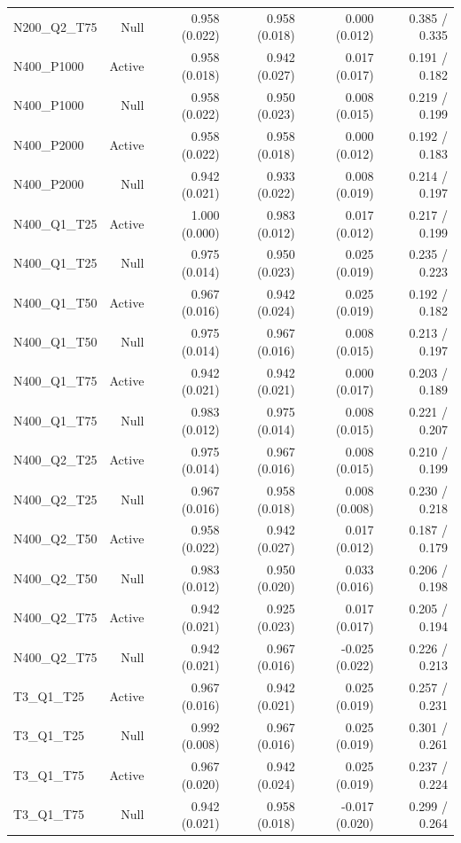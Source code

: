 \begin{longtable}{lrrrrr}
N200\_Q2\_T75 & Null & 0.958 (0.022) & 0.958 (0.018) & 0.000 (0.012) & 0.385 / 0.335 \\
N400\_P1000 & Active & 0.958 (0.018) & 0.942 (0.027) & 0.017 (0.017) & 0.191 / 0.182 \\
N400\_P1000 & Null & 0.958 (0.022) & 0.950 (0.023) & 0.008 (0.015) & 0.219 / 0.199 \\
N400\_P2000 & Active & 0.958 (0.022) & 0.958 (0.018) & 0.000 (0.012) & 0.192 / 0.183 \\
N400\_P2000 & Null & 0.942 (0.021) & 0.933 (0.022) & 0.008 (0.019) & 0.214 / 0.197 \\
N400\_Q1\_T25 & Active & 1.000 (0.000) & 0.983 (0.012) & 0.017 (0.012) & 0.217 / 0.199 \\
N400\_Q1\_T25 & Null & 0.975 (0.014) & 0.950 (0.023) & 0.025 (0.019) & 0.235 / 0.223 \\
N400\_Q1\_T50 & Active & 0.967 (0.016) & 0.942 (0.024) & 0.025 (0.019) & 0.192 / 0.182 \\
N400\_Q1\_T50 & Null & 0.975 (0.014) & 0.967 (0.016) & 0.008 (0.015) & 0.213 / 0.197 \\
N400\_Q1\_T75 & Active & 0.942 (0.021) & 0.942 (0.021) & 0.000 (0.017) & 0.203 / 0.189 \\
N400\_Q1\_T75 & Null & 0.983 (0.012) & 0.975 (0.014) & 0.008 (0.015) & 0.221 / 0.207 \\
N400\_Q2\_T25 & Active & 0.975 (0.014) & 0.967 (0.016) & 0.008 (0.015) & 0.210 / 0.199 \\
N400\_Q2\_T25 & Null & 0.967 (0.016) & 0.958 (0.018) & 0.008 (0.008) & 0.230 / 0.218 \\
N400\_Q2\_T50 & Active & 0.958 (0.022) & 0.942 (0.027) & 0.017 (0.012) & 0.187 / 0.179 \\
N400\_Q2\_T50 & Null & 0.983 (0.012) & 0.950 (0.020) & 0.033 (0.016) & 0.206 / 0.198 \\
N400\_Q2\_T75 & Active & 0.942 (0.021) & 0.925 (0.023) & 0.017 (0.017) & 0.205 / 0.194 \\
N400\_Q2\_T75 & Null & 0.942 (0.021) & 0.967 (0.016) & -0.025 (0.022) & 0.226 / 0.213 \\
T3\_Q1\_T25 & Active & 0.967 (0.016) & 0.942 (0.021) & 0.025 (0.019) & 0.257 / 0.231 \\
T3\_Q1\_T25 & Null & 0.992 (0.008) & 0.967 (0.016) & 0.025 (0.019) & 0.301 / 0.261 \\
T3\_Q1\_T75 & Active & 0.967 (0.020) & 0.942 (0.024) & 0.025 (0.019) & 0.237 / 0.224 \\
T3\_Q1\_T75 & Null & 0.942 (0.021) & 0.958 (0.018) & -0.017 (0.020) & 0.299 / 0.264 \\

\end{longtable}
